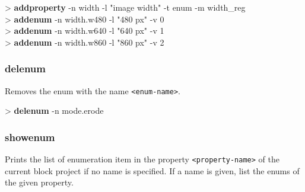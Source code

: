 \documentclass[10pt,a4paper]{article}
\begin{document}
{

\begin{sampletitle}
> \textbf{\tool{} addproperty} -n width -l "image width" -t enum -m width\_reg \\
> \textbf{\tool{} addenum} -n width.w480 -l "480 px" -v 0 \\
> \textbf{\tool{} addenum} -n width.w640 -l "640 px" -v 1 \\
> \textbf{\tool{} addenum} -n width.w860 -l "860 px" -v 2
\end{sampletitle}


\subsubsection{delenum}
\label{subsec:delenum}

Removes the enum with the name \texttt{<enum-name>}.\\


\begin{sampletitle}
> \textbf{\tool{} delenum} -n mode.erode
\end{sampletitle}


\subsubsection{showenum}
\label{subsec:showenum}

Prints the list of enumeration item in the property \texttt{<property-name>} of the current block project if no name is specified. If a name is given, list the enums of the given property.
}
\end{document}
